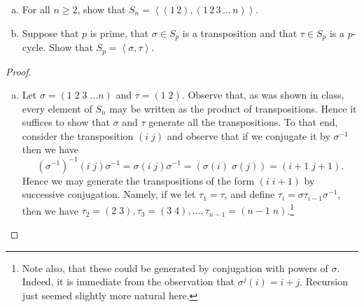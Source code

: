 \documentclass[10pt]{amsart}
\begin{document}
\begin{ex2}
  \begin{enumerate}[(a)]
    \item
      For all $n \geq 2$, show that $S_n = \left<(1\, 2), (1\, 2\, 3\, \ldots\, n)\right>$.
    \item
      Suppose that $p$ is prime, that $\sigma \in S_p$ is a transposition and that $\tau \in S_p$ is a $p$-cycle.
      Show that $S_p = \left<\sigma, \tau\right>$.
  \end{enumerate}
  \begin{proof}
    \begin{enumerate}[(a)]
    \item
      Let $\sigma = \left(1\; 2\; 3\; \ldots n\right)$ and $\tau = \left(1\; 2\right)$.
      Observe that, as was shown in class, every element of $S_n$ may be written as the product of transpositions.
      Hence it suffices to show that $\sigma$ and $\tau$ generate all the transpositions.
      To that end, consider the transposition $\left(i\; j\right)$ and observe that if we conjugate it by $\sigma^{-1}$ then we have
      $$\left(\sigma^{-1}\right)^{-1} \left(i\; j\right) \sigma^{-1} = \sigma \left(i\; j\right) \sigma^{-1} = \left(\sigma\left(i\right)\; \sigma\left(j\right)\right) = \left(i+1\; j+1\right).$$
      Hence we may generate the transpositions of the form $\left(i\; i+1\right)$ by successive conjugation.
      Namely, if we let $\tau_1 = \tau$, and define $\tau_i = \sigma\tau_{i-1}\sigma^{-1}$, then we have $\tau_2 = \left(2\; 3\right), \tau_3 = \left(3\; 4\right), \ldots, \tau_{n-1} = \left(n-1\; n\right)$.\footnote[1]{Note also, that these could be generated by conjugation with powers of $\sigma$.  Indeed, it is immediate from the observation that $\sigma^j(i) = i+j$.  Recursion just seemed slightly more natural here.}


\end{enumerate}
\end{proof}
\end{ex2}
\end{document}
